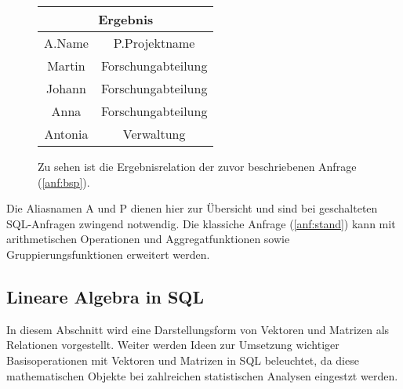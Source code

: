 \begin{figure}[h]
    \centering
\begin{tabular}{|c|c|} \hline
    \multicolumn{2}{|c|}{\textbf{Ergebnis}} \\ \hline
    \hline
    A.Name & P.Projektname \\ 
    \hline
    Martin &Forschungabteilung \\ 
    \hline
    Johann &Forschungabteilung\\
    \hline
    Anna &Forschungabteilung\\ 
    \hline
    Antonia &Verwaltung \\
    \hline
\end{tabular}
\caption{Zu sehen ist die Ergebnisrelation der zuvor beschriebenen Anfrage (\ref{anf:bsp}).}
\label{abb:result_relation}
\end{figure}
Die Aliasnamen \glqq A\grqq{} und \glqq P\grqq{} dienen hier zur Übersicht und sind bei geschalteten SQL-Anfragen zwingend notwendig. Die klassiche Anfrage (\ref{anf:stand}) kann mit arithmetischen Operationen und Aggregatfunktionen sowie Gruppierungsfunktionen erweitert werden.

\subsection{Lineare Algebra in SQL}
\label{linalgsql}
In diesem Abschnitt wird eine Darstellungsform von Vektoren und Matrizen als Relationen vorgestellt. Weiter werden Ideen zur Umsetzung wichtiger Basisoperationen mit Vektoren und Matrizen in SQL beleuchtet, da diese mathematischen Objekte bei zahlreichen statistischen Analysen eingestzt werden.
